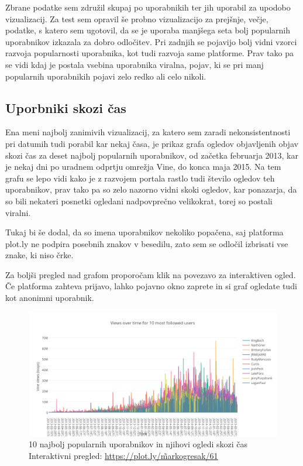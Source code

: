 \documentclass[a4paper,11pt]{article}
\begin{document}
Zbrane podatke sem združil skupaj po uporabnikih ter jih uporabil za upodobo vizualizacij. Za test sem opravil še probno vizualizacijo za prejšnje, večje, podatke, s katero sem ugotovil, da se je uporaba manjšega seta bolj popularnih uporabnikov izkazala za dobro odločitev. Pri zadnjih se pojavijo bolj vidni vzorci razvoja popularnosti uporabnika, kot tudi razvoja same platforme. Prav tako pa se vidi kdaj je postala vsebina uporabnika viralna, pojav, ki se pri manj popularnih uporabnikih pojavi zelo redko ali celo nikoli.

\subsection{Uporbniki skozi čas}

Ena meni najbolj zanimivih vizualizacij, za katero sem zaradi nekonsistentnosti pri datumih tudi porabil kar nekaj časa, je prikaz grafa ogledov objavljenih objav skozi čas za deset najbolj popularnih uporabnikov, od začetka februarja 2013, kar je nekaj dni po uradnem odprtju omrežja Vine, do konca maja 2015. Na tem grafu se lepo vidi kako je z razvojem portala rastlo tudi število ogledov teh uporabnikov, prav tako pa so zelo nazorno vidni skoki ogledov, kar ponazarja, da so bili nekateri posnetki ogledani nadpovprečno velikokrat, torej so postali viralni.
\par
Tukaj bi še dodal, da so imena uporabnikov nekoliko popačena, saj platforma plot.ly ne podpira posebnih znakov v besedilu, zato sem se odločil izbrisati vse znake, ki niso črke.
\par
Za boljši pregled nad grafom proporočam klik na povezavo za interaktiven ogled. Če platforma zahteva prijavo, lahko pojavno okno zaprete in si graf ogledate tudi kot anonimni uporabnik.

\pagebreak

\begin{figure}[htbp]
  \begin{center}
    \includegraphics[width=\textwidth,height=\textheight,keepaspectratio]{figures/views-over-time.png}
    \caption{10 najbolj popularnih uporabnikov in njihovi ogledi skozi čas\\
    Interaktivni pregled: \href{https://plot.ly/\~markogresak/61}{\underline{https://plot.ly/\~markogresak/61}}}
  \end{center}
\end{figure}
\end{document}
